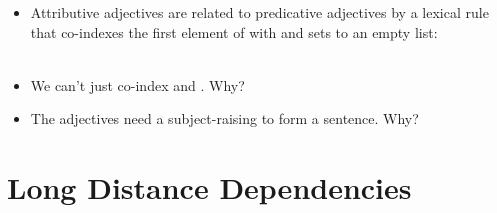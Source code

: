 \documentclass[a4paper,landscape,headrule,footrule]{foils}
\begin{document}
\begin{itemize}
 \item Attributive adjectives are related to predicative adjectives by
   a lexical rule that co-indexes the first element of  with
    and sets  to an empty list: 
\\     \into {}
   \\    
 \item We can't just co-index  and .  Why?
 \item The  adjectives need a
   subject-raising \eng{be} to form a sentence. Why?
 \end{itemize}


\section{Long Distance Dependencies}
\end{document}
